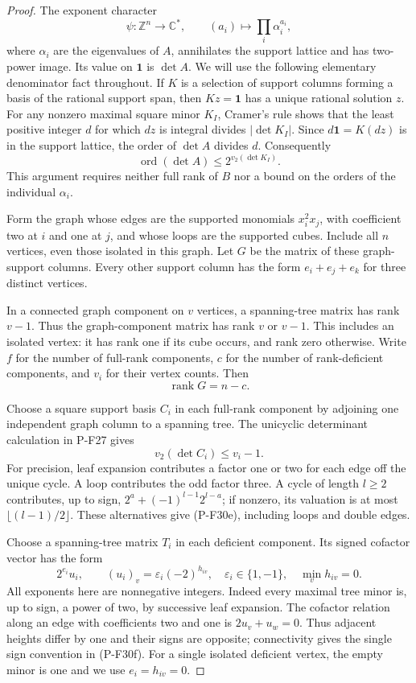 \documentclass[11pt,a4paper]{article}
\begin{document}
\begin{proof}
The exponent character
\[
 \psi:\mathbb Z^n\longrightarrow\mathbb C^*,
 \qquad (a_i)\longmapsto\prod_i\alpha_i^{a_i},
\]
where $\alpha_i$ are the eigenvalues of $A$, annihilates
the support lattice and has two-power image. Its value
on $\mathbf1$ is $\det A$.
We will use the following elementary denominator fact
throughout. If $K$ is a selection of support columns
forming a basis of the rational support span, then
$Kz=\mathbf1$ has a unique rational solution $z$.
For any nonzero maximal square minor $K_I$, Cramer's
rule shows that the least positive integer $d$ for
which $dz$ is integral divides $|\det K_I|$.
Since $d\mathbf1=K(dz)$ is in the support lattice,
the order of $\det A$ divides $d$. Consequently
\[
 \operatorname{ord}(\det A)\le2^{v_2(\det K_I)}.
 \tag{P-F30c}
\]
This argument requires neither full rank of $B$
nor a bound on the orders of the individual $\alpha_i$.

Form the graph whose edges are the supported monomials
$x_i^2x_j$, with coefficient two at $i$ and one at $j$,
and whose loops are the supported cubes. Include all
$n$ vertices, even those isolated in this graph.
Let $G$ be the matrix of these graph-support columns.
Every other support column has the form
$e_i+e_j+e_k$ for three distinct vertices.

In a connected graph component on $v$ vertices,
a spanning-tree matrix has rank $v-1$. Thus the
graph-component matrix has rank $v$ or $v-1$.
This includes an isolated vertex: it has rank one
if its cube occurs, and rank zero otherwise.
Write $f$ for the number of full-rank components,
$c$ for the number of rank-deficient components,
and $v_i$ for their vertex counts. Then
\[
 \operatorname{rank}G=n-c.
 \tag{P-F30d}
\]

Choose a square support basis $C_i$ in each full-rank
component by adjoining one independent graph column
to a spanning tree. The unicyclic determinant
calculation in P-F27 gives
\[
 v_2(\det C_i)\le v_i-1.
 \tag{P-F30e}
\]
For precision, leaf expansion contributes a factor
one or two for each edge off the unique cycle.
A loop contributes the odd factor three.
A cycle of length $l\ge2$ contributes, up to sign,
$2^a+(-1)^{l-1}2^{l-a}$; if nonzero, its valuation
is at most $\lfloor(l-1)/2\rfloor$. These alternatives
give (P-F30e), including loops and double edges.

Choose a spanning-tree matrix $T_i$ in each deficient
component. Its signed cofactor vector has the form
\[
 2^{e_i}u_i,\qquad
 (u_i)_v=\varepsilon_i(-2)^{h_{iv}},
 \quad \varepsilon_i\in\{1,-1\},\quad
 \min_v h_{iv}=0.
 \tag{P-F30f}
\]
All exponents here are nonnegative integers.
Indeed every maximal tree minor is, up to sign,
a power of two, by successive leaf expansion.
The cofactor relation along an edge with
coefficients two and one is $2u_v+u_w=0$.
Thus adjacent heights differ by one and their
signs are opposite; connectivity gives the
single sign convention in (P-F30f).
For a single isolated deficient vertex, the
empty minor is one and we use $e_i=h_{iv}=0$.


\end{proof}
\end{document}
